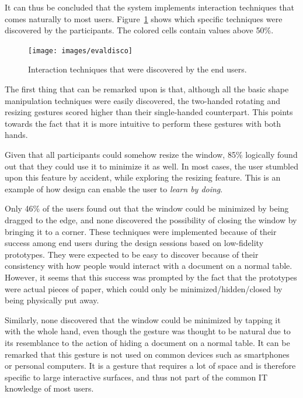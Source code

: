 It can thus be concluded that the system implements interaction techniques that comes naturally to most users.
Figure~\ref{fig:evaldisco} shows which specific techniques were discovered by the participants. The colored cells contain values above 50\%.

\begin{figure}[htb]
  \centering
    \texttt{[image: images/evaldisco]}
    \caption{Interaction techniques that were discovered by the end users.}
    \label{fig:evaldisco}
\end{figure}

The first thing that can be remarked upon is that, although all the basic shape manipulation techniques were easily discovered, the two-handed rotating and resizing gestures scored higher than their single-handed counterpart.
This points towards the fact that it is more intuitive to perform these gestures with both hands.

Given that all participants could somehow resize the window, 85\% logically found out that they could use it to minimize it as well.
In most cases, the user stumbled upon this feature by accident, while exploring the resizing feature.
This is an example of how design can enable the user to \emph{learn by doing}.

Only 46\% of the users found out that the window could be minimized by being dragged to the edge, and none discovered the possibility of closing the window by bringing it to a corner.
These techniques were implemented because of their success among end users during the design sessions based on low-fidelity prototypes.
They were expected to be easy to discover because of their consistency with how people would interact with a document on a normal table.
However, it seems that this success was prompted by the fact that  the prototypes were actual pieces of paper, which could only be minimized/hidden/closed by being physically put away.

Similarly, none discovered that the window could be minimized by tapping it with the whole hand, even though the gesture was thought to be natural due to its resemblance to the action of hiding a document on a normal table.
It can be remarked that this gesture is not used on common devices such as smartphones or personal computers.
It is a gesture that requires a lot of space and is therefore specific to large interactive surfaces, and thus not part of the common IT knowledge of most users.

